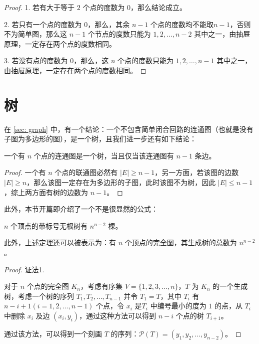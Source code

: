 \documentclass[cn,hazy,sakura,14pt,normal]{elegantnote}
\begin{document}
\begin{sloppypar}
\begin{proof}
    1. 若有大于等于 $2$ 个点的度数为 $0$，那么结论成立。
    
    2. 若只有一个点的度数为 $0$，那么，其余 $n - 1$ 个点的度数均不能取$n - 1$，否则不为简单图，那么这 $n - 1$ 个节点的度数只能为 $1, 2, \dots, n - 2$ 其中之一，由抽屉原理，一定存在两个点的度数相同。

    3. 若没有点的度数为 $0$，那么，这 $n$ 个点的度数只能为 $1, 2, \dots, n - 1$ 其中之一，由抽屉原理，一定存在两个点的度数相同。
\end{proof}

\section{树}

在 \ref{sec: graph} 中，有一个结论：一个不包含简单闭合回路的连通图（也就是没有子图为多边形的图），是一个树，且我们进一步还有如下结论：

\begin{theorem}
    一个有 $n$ 个点的连通图是一个树，当且仅当该连通图有 $n - 1$ 条边。
\end{theorem}

\begin{proof}
    一个有 $n$ 个点的联通图必然有 $\left| E \right| \geq n - 1$，另一方面，若该图的边数 $\left| E \right| \geq n$，那么该图一定存在为多边形的子图，此时该图不为树，因此 $\left| E \right| \leq n - 1$，综上两方面有树的边数为 $n - 1$。
\end{proof}

此外，本节开篇即介绍了一个不是很显然的公式：

\begin{theorem} [Cayley 公式]
    $n$ 个顶点的带标号无根树有 $n ^ {n - 2}$ 棵。
\end{theorem}

此外，上述定理还可以被表示为：有 $n$ 个顶点的完全图，其生成树的总数为 $n ^ {n - 2}$。

\begin{proof}
    证法1.

    对于 $n$ 个点的完全图 $K_n$，考虑有序集 $V = \{1, 2, 3, \dots, n\}$，$T$ 为 $K_n$ 的一个生成树，考虑一个树的序列 $T_1, T_2, \dots, T_{n - 1}$ 并令 $T_1 = T$，其中 $T_i$ 有 $n - i + 1(i = 1, 2, \dots, n - 1)$ 个点，令 $x_i$ 是$T_i$ 中编号最小的度为 $1$ 的点，从 $T_i$ 中删除 $x_i$ 及边 $(x_i, y_i)$，通过这种方法可以得到 $n - i$ 个点的树 $T_{i + 1}$。

    通过该方法，可以得到一个刻画 $T$ 的序列：$\mathcal{P}(T) = (y_1, y_2, \dots, y_{n - 2})$。


\end{proof}
\end{sloppypar}
\end{document}
